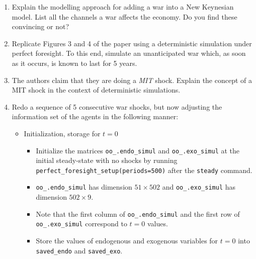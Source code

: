 \documentclass[a4paper]{scrartcl}
\begin{document}
\begin{enumerate}

\item
Explain the modelling approach for adding a war into a New Keynesian model.
List all the channels a war affects the economy.
Do you find these convincing or not?

\item
Replicate Figures 3 and 4 of the paper using a deterministic simulation under perfect foresight.
To this end, simulate an unanticipated war which, as soon as it occurs, is known to last for 5 years.

\item
The authors claim that they are doing a \emph{MIT} shock.
Explain the concept of a MIT shock in the context of deterministic simulations.

\item
Redo a sequence of 5 consecutive war shocks, but now adjusting the information set of the agents in the following manner:

\begin{itemize}
  \item
  Initialization, storage for \(t=0\)
  \begin{itemize}
    \item
    Initialize the matrices \texttt{oo{\_}.endo{\_}simul} and \texttt{oo{\_}.exo{\_}simul} at the initial steady-state with no shocks
      by running \texttt{perfect{\_}foresight{\_}setup{(periods=500)}} after the \texttt{steady} command.
    \item
    \texttt{oo{\_}.endo{\_}simul} has dimension \(51 \times 502\) and \texttt{oo{\_}.exo{\_}simul} has dimension \(502 \times 9\).
    \item
    Note that the first column of \texttt{oo{\_}.endo{\_}simul} and the first row of \texttt{oo{\_}.exo{\_}simul} correspond to \(t=0\) values.
    \item
    Store the values of endogenous and exogenous variables for \(t=0\) into \texttt{saved{\_}endo} and \texttt{saved{\_}exo}.
  \end{itemize}
    

\end{itemize}
\end{enumerate}
\end{document}
